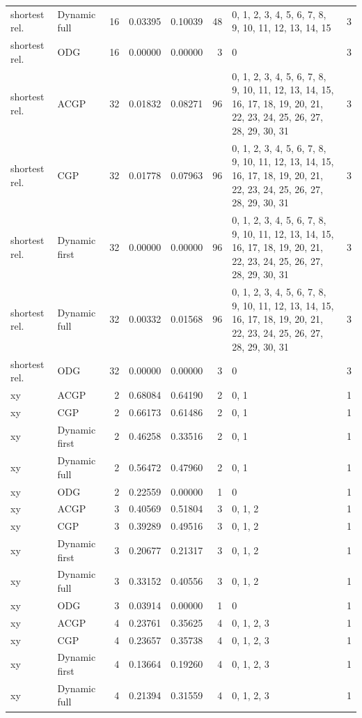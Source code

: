 \documentclass[10pt,a4paper]{article}
\begin{document}
\begin{longtable}{@{}p{23mm}p{29mm}rrrrp{36mm}r@{}}
shortest rel. & Dynamic full & 16 & 0.03395 & 0.10039 & 48 & 0, 1, 2, 3, 4, 5, 6, 7, 8, 9, 10, 11, 12, 13, 14, 15 & 3 \\
shortest rel. & ODG & 16 & 0.00000 & 0.00000 & 3 & 0 & 3 \\
shortest rel. & ACGP & 32 & 0.01832 & 0.08271 & 96 & 0, 1, 2, 3, 4, 5, 6, 7, 8, 9, 10, 11, 12, 13, 14, 15, 16, 17, 18, 19, 20, 21, 22, 23, 24, 25, 26, 27, 28, 29, 30, 31 & 3 \\
shortest rel. & CGP & 32 & 0.01778 & 0.07963 & 96 & 0, 1, 2, 3, 4, 5, 6, 7, 8, 9, 10, 11, 12, 13, 14, 15, 16, 17, 18, 19, 20, 21, 22, 23, 24, 25, 26, 27, 28, 29, 30, 31 & 3 \\
shortest rel. & Dynamic first & 32 & 0.00000 & 0.00000 & 96 & 0, 1, 2, 3, 4, 5, 6, 7, 8, 9, 10, 11, 12, 13, 14, 15, 16, 17, 18, 19, 20, 21, 22, 23, 24, 25, 26, 27, 28, 29, 30, 31 & 3 \\
shortest rel. & Dynamic full & 32 & 0.00332 & 0.01568 & 96 & 0, 1, 2, 3, 4, 5, 6, 7, 8, 9, 10, 11, 12, 13, 14, 15, 16, 17, 18, 19, 20, 21, 22, 23, 24, 25, 26, 27, 28, 29, 30, 31 & 3 \\
shortest rel. & ODG & 32 & 0.00000 & 0.00000 & 3 & 0 & 3 \\
xy & ACGP & 2 & 0.68084 & 0.64190 & 2 & 0, 1 & 1 \\
xy & CGP & 2 & 0.66173 & 0.61486 & 2 & 0, 1 & 1 \\
xy & Dynamic first & 2 & 0.46258 & 0.33516 & 2 & 0, 1 & 1 \\
xy & Dynamic full & 2 & 0.56472 & 0.47960 & 2 & 0, 1 & 1 \\
xy & ODG & 2 & 0.22559 & 0.00000 & 1 & 0 & 1 \\
xy & ACGP & 3 & 0.40569 & 0.51804 & 3 & 0, 1, 2 & 1 \\
xy & CGP & 3 & 0.39289 & 0.49516 & 3 & 0, 1, 2 & 1 \\
xy & Dynamic first & 3 & 0.20677 & 0.21317 & 3 & 0, 1, 2 & 1 \\
xy & Dynamic full & 3 & 0.33152 & 0.40556 & 3 & 0, 1, 2 & 1 \\
xy & ODG & 3 & 0.03914 & 0.00000 & 1 & 0 & 1 \\
xy & ACGP & 4 & 0.23761 & 0.35625 & 4 & 0, 1, 2, 3 & 1 \\
xy & CGP & 4 & 0.23657 & 0.35738 & 4 & 0, 1, 2, 3 & 1 \\
xy & Dynamic first & 4 & 0.13664 & 0.19260 & 4 & 0, 1, 2, 3 & 1 \\
xy & Dynamic full & 4 & 0.21394 & 0.31559 & 4 & 0, 1, 2, 3 & 1 \\

\end{longtable}
\end{document}
